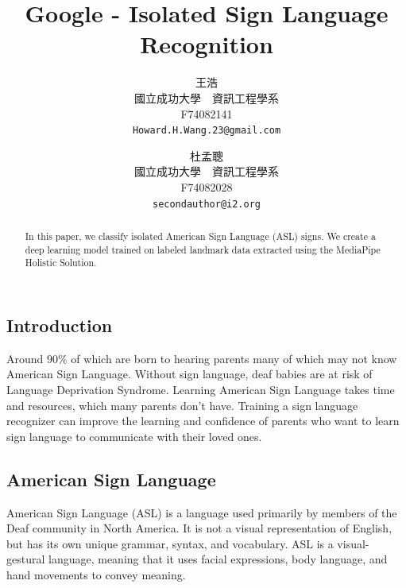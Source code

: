 \documentclass[10pt,twocolumn,letterpaper]{article}
\begin{document}
\begin{CJK*}{UTF8}{bsmi}

\title{Google - Isolated Sign Language Recognition}

\author{王浩 \\
國立成功大學　資訊工程學系\\
F74082141\\
{\tt\small Howard.H.Wang.23@gmail.com}
\and
杜孟聰\\
國立成功大學　資訊工程學系\\
F74082028\\
{\tt\small secondauthor@i2.org}
}
\maketitle

\begin{abstract}
   In this paper, we classify isolated American Sign Language (ASL) signs. We create a deep learning model trained on labeled landmark data extracted using the MediaPipe Holistic Solution.
\end{abstract}

\section{Introduction}
\label{sec:intro}
Around $90\%$ of which are born to hearing parents many of which may not know American Sign Language. 
Without sign language, deaf babies are at risk of Language Deprivation Syndrome. 
Learning American Sign Language takes time and resources, which many parents don't have.
Training a sign language recognizer can improve the learning and confidence of parents who want to learn sign language to communicate with their loved ones.

\subsection{American Sign Language}

American Sign Language (ASL) is a language used primarily by members of the Deaf community in North America. 
It is not a visual representation of English, but has its own unique grammar, syntax, and vocabulary. 
ASL is a visual-gestural language, meaning that it uses facial expressions, body language, and hand movements to convey meaning.


\end{CJK*}
\end{document}
